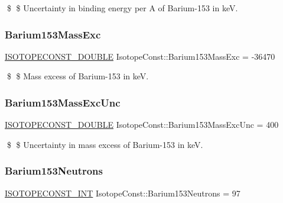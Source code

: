 \$ \$ Uncertainty in binding energy per A of Barium-\/153 in keV. \mbox{\label{group___isotope_const-_barium-_ba153_ga7240e7e78f7fd7921cbce089c0e3e967}} 
\subsubsection{\texorpdfstring{Barium153\+Mass\+Exc}{Barium153MassExc}}
{\footnotesize\ttfamily \mbox{\hyperlink{group___isotope_const-_macros_ga8f45a7272ce02c0b4c65c44636ed719a}{I\+S\+O\+T\+O\+P\+E\+C\+O\+N\+S\+T\+\_\+\+D\+O\+U\+B\+LE}} Isotope\+Const\+::\+Barium153\+Mass\+Exc = -\/36470}

\$ \$ Mass excess of Barium-\/153 in keV. \mbox{\label{group___isotope_const-_barium-_ba153_gac7cf9ffce67f61c76d06682da409f001}} 
\subsubsection{\texorpdfstring{Barium153\+Mass\+Exc\+Unc}{Barium153MassExcUnc}}
{\footnotesize\ttfamily \mbox{\hyperlink{group___isotope_const-_macros_ga8f45a7272ce02c0b4c65c44636ed719a}{I\+S\+O\+T\+O\+P\+E\+C\+O\+N\+S\+T\+\_\+\+D\+O\+U\+B\+LE}} Isotope\+Const\+::\+Barium153\+Mass\+Exc\+Unc = 400}

\$ \$ Uncertainty in mass excess of Barium-\/153 in keV. \mbox{\label{group___isotope_const-_barium-_ba153_ga73f91d0dca46907aae800587db670baf}} 
\subsubsection{\texorpdfstring{Barium153\+Neutrons}{Barium153Neutrons}}
{\footnotesize\ttfamily \mbox{\hyperlink{group___isotope_const-_macros_ga5f18360b3e99483a35c32d789e62621c}{I\+S\+O\+T\+O\+P\+E\+C\+O\+N\+S\+T\+\_\+\+I\+NT}} Isotope\+Const\+::\+Barium153\+Neutrons = 97}

